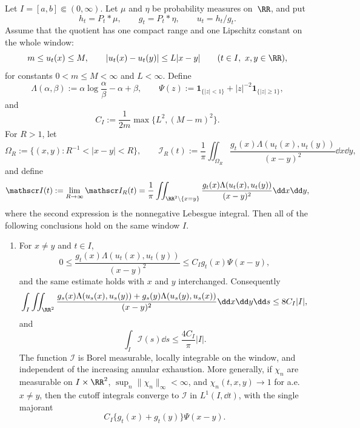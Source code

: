 \begin{proposition}[Bounded Lipschitz quotient implies \(H'=-I\)]%
\label{prop:compact-window-bregman-identity}
Let \(I=[a,b]\Subset(0,\infty)\).  Let \(\mu\) and \(\eta\) be probability
measures on~\(\RR\), and put
\[
h_t=P_t*\mu,\qquad g_t=P_t*\eta,\qquad u_t=h_t/g_t .
\]
Assume that the quotient has one compact range and one Lipschitz constant on
the whole window:
\begin{equation}\label{eq:abstract-bounded-lipschitz-quotient-hypothesis}
m\le u_t(x)\le M,\qquad |u_t(x)-u_t(y)|\le L|x-y|
\qquad(t\in I,\ x,y\in\RR),
\end{equation}
for constants \(0<m\le M<\infty\) and \(L<\infty\).  Define
\[
\Lambda(\alpha,\beta):=\alpha\log\frac{\alpha}{\beta}-\alpha+\beta,
\qquad
\Psi(z):=\mathbf1_{\{|z|<1\}}+|z|^{-2}\mathbf1_{\{|z|\ge1\}},
\]
and
\[
C_I:=\frac{1}{2m}\max\{L^2,(M-m)^2\}.
\]
For \(R>1\), let
\[
\Omega_R:=\{(x,y):R^{-1}<|x-y|<R\},
\qquad
\mathscr I_R(t):=\frac1\pi\iint_{\Omega_R}
\frac{g_t(x)\Lambda(u_t(x),u_t(y))}{(x-y)^2}\dd x\dd y ,
\]
and define
\begin{equation}\label{eq:abstract-bounded-lipschitz-full-dissipation}
\mathscr I(t):=\lim_{R\to\infty}\mathscr I_R(t)
=\frac1\pi\iint_{\RR^2\setminus\{x=y\}}
\frac{g_t(x)\Lambda(u_t(x),u_t(y))}{(x-y)^2}\dd x\dd y,
\end{equation}
where the second expression is the nonnegative Lebesgue integral.  Then all
of the following conclusions hold on the same window \(I\).

\begin{enumerate}
\item For \(x\ne y\) and \(t\in I\),
\begin{equation}\label{eq:abstract-bounded-lipschitz-majorant}
0\le
\frac{g_t(x)\Lambda(u_t(x),u_t(y))}{(x-y)^2}
\le C_I g_t(x)\Psi(x-y),
\end{equation}
and the same estimate holds with \(x\) and \(y\) interchanged.  Consequently
\begin{equation}\label{eq:abstract-bounded-lipschitz-sym-integral-bound}
\int_I\iint_{\RR^2}
\frac{
g_s(x)\Lambda(u_s(x),u_s(y))
+g_s(y)\Lambda(u_s(y),u_s(x))}
{(x-y)^2}\dd x\dd y\dd s
\le 8C_I|I|,
\end{equation}
and
\begin{equation}\label{eq:abstract-bounded-lipschitz-one-sided-bound}
\int_I \mathscr I(s)\dd s\le \frac{4C_I}{\pi}|I|.
\end{equation}
The function \(\mathscr I\) is Borel measurable, locally integrable on the
window, and independent of the increasing annular exhaustion.  More generally, if
\(\chi_n\) are measurable on \(I\times\RR^2\),
\(\sup_n\|\chi_n\|_\infty<\infty\), and
\(\chi_n(t,x,y)\to1\) for a.e. \(x\ne y\), then the cutoff integrals converge
to \(\mathscr I\) in \(L^1(I,\dd t)\), with the single majorant
\[
C_I\{g_t(x)+g_t(y)\}\Psi(x-y).
\]


\end{enumerate}
\end{proposition}
